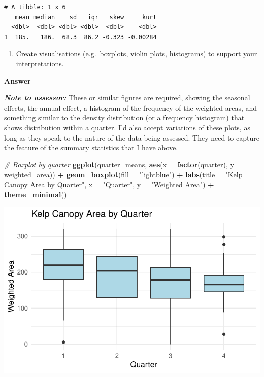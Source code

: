 \documentclass[
  british,
  10pt,
]{article}
\newenvironment{Shaded}{\begin{snugshade}}{\end{snugshade}}
\newcommand{\AttributeTok}[1]{\textcolor[rgb]{0.13,0.29,0.53}{#1}}
\newcommand{\CommentTok}[1]{\textcolor[rgb]{0.56,0.35,0.01}{\textit{#1}}}
\newcommand{\FunctionTok}[1]{\textcolor[rgb]{0.13,0.29,0.53}{\textbf{#1}}}
\newcommand{\NormalTok}[1]{#1}
\newcommand{\SpecialCharTok}[1]{\textcolor[rgb]{0.81,0.36,0.00}{\textbf{#1}}}
\newcommand{\StringTok}[1]{\textcolor[rgb]{0.31,0.60,0.02}{#1}}
\providecommand{\tightlist}{%
  \setlength{\itemsep}{0pt}\setlength{\parskip}{0pt}}
\begin{document}
\begin{verbatim}
# A tibble: 1 x 6
   mean median    sd   iqr   skew     kurt
  <dbl>  <dbl> <dbl> <dbl>  <dbl>    <dbl>
1  185.   186.  68.3  86.2 -0.323 -0.00284
\end{verbatim}

\begin{enumerate}
\def\labelenumi{\arabic{enumi}.}
\setcounter{enumi}{1}
\tightlist
\item
  Create visualisations (e.g.~boxplots, violin plots, histograms) to
  support your interpretations.
\end{enumerate}

\textbf{Answer}

\textbf{\emph{Note to assessor:}} These or similar figures are required,
showing the seasonal effects, the annual effect, a histogram of the
frequency of the weighted areas, and something similar to the density
distribution (or a frequency histogram) that shows distribution within a
quarter. I'd also accept variations of these plots, as long as they
speak to the nature of the data being assessed. They need to capture the
feature of the summary statistics that I have above.

\begin{Shaded}
\begin{Highlighting}[]
\CommentTok{\# Boxplot by quarter}
\FunctionTok{ggplot}\NormalTok{(quarter\_means, }\FunctionTok{aes}\NormalTok{(}\AttributeTok{x =} \FunctionTok{factor}\NormalTok{(quarter), }\AttributeTok{y =}\NormalTok{ weighted\_area)) }\SpecialCharTok{+}
  \FunctionTok{geom\_boxplot}\NormalTok{(}\AttributeTok{fill =} \StringTok{"lightblue"}\NormalTok{) }\SpecialCharTok{+}
  \FunctionTok{labs}\NormalTok{(}\AttributeTok{title =} \StringTok{"Kelp Canopy Area by Quarter"}\NormalTok{,}
       \AttributeTok{x =} \StringTok{"Quarter"}\NormalTok{, }\AttributeTok{y =} \StringTok{"Weighted Area"}\NormalTok{) }\SpecialCharTok{+}
  \FunctionTok{theme\_minimal}\NormalTok{()}
\end{Highlighting}
\end{Shaded}

\begin{center}
\includegraphics[width=0.6\linewidth,height=\textheight,keepaspectratio]{BCB744_Biostats_Prac_Exam_2025_files/figure-pdf/chunk9-1.pdf}
\end{center}
\end{document}
